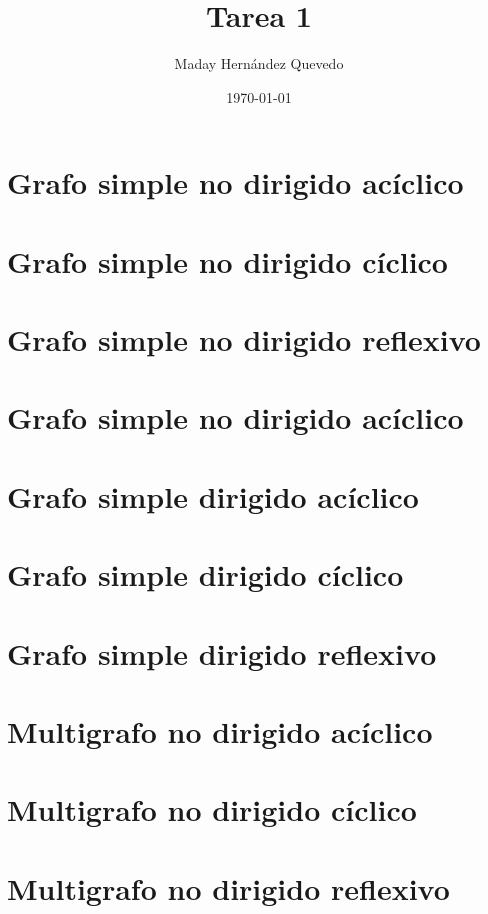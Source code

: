 \documentclass{article}
\author{Maday Hern\'andez Quevedo}
\title{Tarea 1}
\date{\today}
\begin{document}
\maketitle

\section{Grafo simple no dirigido ac\'iclico}

\section{Grafo simple no dirigido c\'iclico}

\section{Grafo simple no dirigido reflexivo}

\section{Grafo simple no dirigido ac\'iclico}

\section{Grafo simple dirigido ac\'iclico}

\section{Grafo simple dirigido c\'iclico}

\section{Grafo simple dirigido reflexivo}

\section{Multigrafo no dirigido ac\'iclico}

\section{Multigrafo no dirigido c\'iclico}

\section{Multigrafo no dirigido reflexivo}
\end{document}
